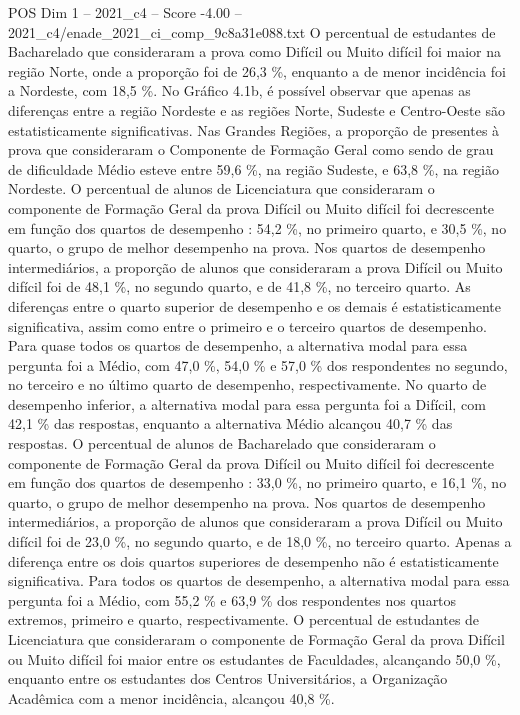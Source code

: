 \begin{textsample}{POS Dim 1 – 2021\_c4 – Score -4.00 – 2021\_c4/enade\_2021\_ci\_comp\_9c8a31e088.txt}
O percentual de estudantes de Bacharelado que consideraram a prova como Difícil ou Muito difícil foi maior na região Norte, onde a proporção foi de 26,3 \%, enquanto a de menor incidência foi a Nordeste, com 18,5 \%.
No Gráfico 4.1b, é possível observar que apenas as diferenças entre a região Nordeste e as regiões Norte, Sudeste e Centro-Oeste são estatisticamente significativas.
Nas Grandes Regiões, a proporção de presentes à prova que consideraram o Componente de Formação Geral como sendo de grau de dificuldade Médio esteve entre 59,6 \%, na região Sudeste, e 63,8 \%, na região Nordeste.
O percentual de alunos de Licenciatura que consideraram o componente de Formação Geral da prova Difícil ou Muito difícil foi decrescente em função dos quartos de desempenho : 54,2 \%, no primeiro quarto, e 30,5 \%, no quarto, o grupo de melhor desempenho na prova.
Nos quartos de desempenho intermediários, a proporção de alunos que consideraram a prova Difícil ou Muito difícil foi de 48,1 \%, no segundo quarto, e de 41,8 \%, no terceiro quarto.
As diferenças entre o quarto superior de desempenho e os demais é estatisticamente significativa, assim como entre o primeiro e o terceiro quartos de desempenho.
Para quase todos os quartos de desempenho, a alternativa modal para essa pergunta foi a Médio, com 47,0 \%, 54,0 \% e 57,0 \% dos respondentes no segundo, no terceiro e no último quarto de desempenho, respectivamente.
No quarto de desempenho inferior, a alternativa modal para essa pergunta foi a Difícil, com 42,1 \% das respostas, enquanto a alternativa Médio alcançou 40,7 \% das respostas.
O percentual de alunos de Bacharelado que consideraram o componente de Formação Geral da prova Difícil ou Muito difícil foi decrescente em função dos quartos de desempenho : 33,0 \%, no primeiro quarto, e 16,1 \%, no quarto, o grupo de melhor desempenho na prova.
Nos quartos de desempenho intermediários, a proporção de alunos que consideraram a prova Difícil ou Muito difícil foi de 23,0 \%, no segundo quarto, e de 18,0 \%, no terceiro quarto.
Apenas a diferença entre os dois quartos superiores de desempenho não é estatisticamente significativa.
Para todos os quartos de desempenho, a alternativa modal para essa pergunta foi a Médio, com 55,2 \% e 63,9 \% dos respondentes nos quartos extremos, primeiro e quarto, respectivamente.
O percentual de estudantes de Licenciatura que consideraram o componente de Formação Geral da prova Difícil ou Muito difícil foi maior entre os estudantes de Faculdades, alcançando 50,0 \%, enquanto entre os estudantes dos Centros Universitários, a Organização Acadêmica com a menor incidência, alcançou 40,8 \%.

\end{textsample}
